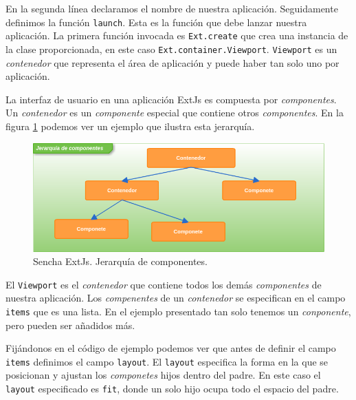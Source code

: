  	\par
 	En la segunda línea declaramos el nombre de nuestra aplicación. Seguidamente definimos la función \texttt{launch}. Esta es la función que debe
	lanzar  nuestra aplicación. La primera función invocada es \texttt{Ext.create} que crea una instancia de la clase proporcionada, en este caso
	\texttt{Ext.container.Viewport}. \texttt{Viewport} es un \emph{contenedor} que representa el área de aplicación y puede haber tan solo uno por
	aplicación. 
 	\par
 	La interfaz de usuario en una aplicación ExtJs es compuesta por \emph{componentes}. Un \emph{contenedor} es un \emph{componente} especial que
	contiene otros \emph{componentes}. En la figura \ref{fig:comps} podemos ver un ejemplo que ilustra esta jerarquía.
	\begin{figure}[h]
		\centering
		\includegraphics[keepaspectratio, width=1\textwidth]{./img/comps.png}
		\caption{Sencha ExtJs. Jerarquía de componentes.}   
		\label{fig:comps}
	\end{figure}
 	\par
 	El \texttt{Viewport} es el \emph{contenedor} que contiene todos los demás \emph{componentes} de nuestra aplicación. Los \emph{compenentes} de
	un \emph{contenedor} se especifican en el campo \texttt{items} que es una lista. En el ejemplo presentado tan solo tenemos un 
	\emph{conponente}, pero pueden ser añadidos más.
 	\par
 	Fijándonos en el código de ejemplo podemos ver que antes de definir el campo \texttt{items} definimos el campo \texttt{layout}. El \texttt{layout}
	especifica la forma en la que se posicionan y ajustan los \emph{componetes} hijos dentro del padre. En este caso el \texttt{layout} especificado es 
	\texttt{\cc fit\cc}, donde un solo hijo ocupa todo el espacio del padre.

